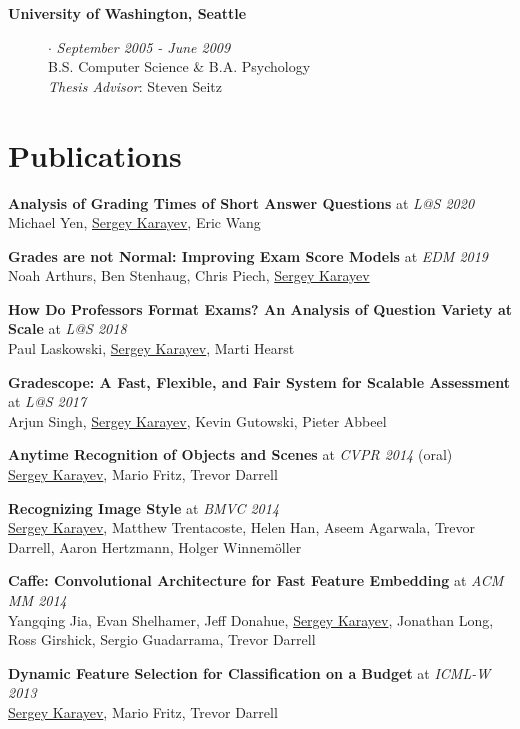 \documentclass[line, margin]{res}
\begin{document}
\begin{resume}
\begin{description}
\item[{\bf University of Washington, Seattle}] $\cdot$ {\it September 2005 - June 2009}
\\B.S. Computer Science \& B.A. Psychology
\\\emph{Thesis Advisor}: Steven Seitz
\end{description}


\section{\sc Publications}

\textbf{Analysis of Grading Times of Short Answer Questions} at \emph{L@S 2020}\\
Michael Yen, \underline{Sergey Karayev}, Eric Wang

\textbf{Grades are not Normal: Improving Exam Score Models} at \emph{EDM 2019}\\
Noah Arthurs, Ben Stenhaug, Chris Piech, \underline{Sergey Karayev}

\textbf{How Do Professors Format Exams? An Analysis of Question Variety at Scale} at \emph{L@S 2018}\\
Paul Laskowski, \underline{Sergey Karayev}, Marti Hearst

\textbf{Gradescope: A Fast, Flexible, and Fair System for Scalable Assessment} at \emph{L@S 2017}\\
Arjun Singh, \underline{Sergey Karayev}, Kevin Gutowski, Pieter Abbeel

\textbf{Anytime Recognition of Objects and Scenes} at \emph{CVPR 2014} (oral)\\
\underline{Sergey Karayev}, Mario Fritz, Trevor Darrell

\textbf{Recognizing Image Style} at \emph{BMVC 2014}\\
\underline{Sergey Karayev}, Matthew Trentacoste, Helen Han, Aseem Agarwala, Trevor Darrell, Aaron Hertzmann, Holger Winnem\"{o}ller

\textbf{Caffe: Convolutional Architecture for Fast Feature Embedding} at \emph{ACM MM 2014}\\
Yangqing Jia, Evan Shelhamer, Jeff Donahue, \underline{Sergey Karayev},
Jonathan Long, Ross Girshick, Sergio Guadarrama, Trevor Darrell

\textbf{Dynamic Feature Selection for Classification on a Budget} at \emph{ICML-W 2013}\\
\underline{Sergey Karayev}, Mario Fritz, Trevor Darrell


\end{resume}
\end{document}

